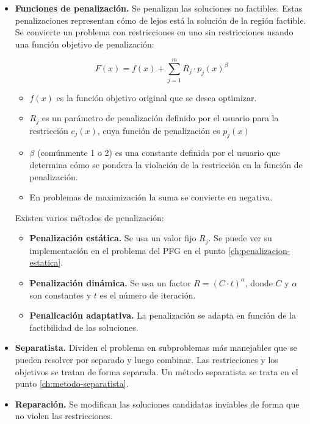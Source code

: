 \begin{itemize}
  \item \textbf{Funciones de penalización.} Se penalizan las soluciones no factibles. Estas penalizaciones representan cómo de lejos está la solución de la región factible. Se convierte un problema con restricciones en uno sin restricciones usando una función objetivo de penalización:
  
  \[
  F(x) = f(x) + \sum_{j=1}^{m} R_j \cdot p_j(x)^\beta
  \]
  
  \begin{itemize}
    \item \( f(x) \) es la función objetivo original que se desea optimizar.
    \item \( R_j \) es un parámetro de penalización definido por el usuario para la restricción \( c_j(x) \), cuya función de penalización es \( p_j(x) \)
    \item \( \beta \) (comúnmente 1 o 2) es una constante definida por el usuario que determina cómo se pondera la violación de la restricción en la función de penalización.
    \item En problemas de maximización la suma se convierte en negativa.     
  \end{itemize}

  \newpage
  Existen varios métodos de penalización:
  
    \begin{itemize}
      \item \textbf{Penalización estática.} Se usa un valor fijo \( R_j \). Se puede ver su implementación en el problema del PFG en el punto \ref{ch:penalizacion-estatica}.
      \item \textbf{Penalización dinámica.} Se usa un factor \( R = (C \cdot t) ^ {\alpha} \), donde \( C \) y \( \alpha \) son constantes y \( t \) es el número de iteración.
      \item \textbf{Penalicación adaptativa.} La penalización se adapta en función de la factibilidad de las soluciones.
    \end{itemize}
  \item \textbf{Separatista.} Dividen el problema en subproblemas más manejables que se pueden resolver por separado y luego combinar. Las restricciones y los objetivos se tratan de forma separada. Un método separatista se trata en el punto \ref{ch:metodo-separatista}.

  \item \textbf{Reparación.} Se modifican las soluciones candidatas inviables de forma que no violen las restricciones.
\end{itemize}

